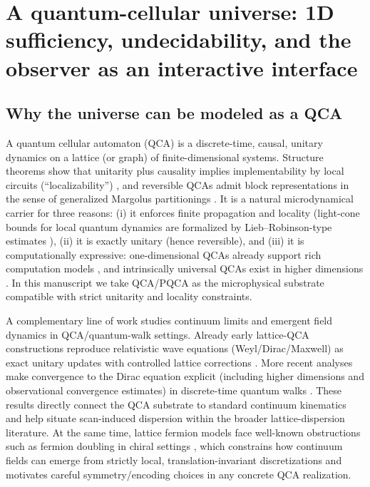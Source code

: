\section{A quantum-cellular universe: 1D sufficiency, undecidability, and the observer as an interactive interface}
\label{sec:qca}

\subsection{Why the universe can be modeled as a QCA}
A quantum cellular automaton (QCA) is a discrete-time, causal, unitary dynamics on a lattice (or graph) of finite-dimensional systems.
Structure theorems show that unitarity plus causality implies implementability by local circuits (``localizability'') \cite{ArrighiNesmeWerner2011}, and reversible QCAs admit block representations in the sense of generalized Margolus partitionings \cite{SchumacherWerner2004}.
It is a natural microdynamical carrier for three reasons:
(i) it enforces finite propagation and locality (light-cone bounds for local quantum dynamics are formalized by Lieb--Robinson-type estimates \cite{LiebRobinson1972}),
(ii) it is exactly unitary (hence reversible), and
(iii) it is computationally expressive: one-dimensional QCAs already support rich computation models \cite{Watrous1995}, and intrinsically universal QCAs exist in higher dimensions \cite{ArrighiGrattage2010}.
In this manuscript we take QCA/PQCA as the microphysical substrate compatible with strict unitarity and locality constraints.

\noindent A complementary line of work studies continuum limits and emergent field dynamics in QCA/quantum-walk settings.
Already early lattice-QCA constructions reproduce relativistic wave equations (Weyl/Dirac/Maxwell) as exact unitary updates with controlled lattice corrections \cite{BialynickiBirula1994}.
More recent analyses make convergence to the Dirac equation explicit (including higher dimensions and observational convergence estimates) in discrete-time quantum walks \cite{ArrighiNesmeForets2014,ArrighiDiMolfetta2018}.
These results directly connect the QCA substrate to standard continuum kinematics and help situate scan-induced dispersion within the broader lattice-dispersion literature.
\noindent At the same time, lattice fermion models face well-known obstructions such as fermion doubling in chiral settings \cite{NielsenNinomiya1981}, which constrains how continuum fields can emerge from strictly local, translation-invariant discretizations and motivates careful symmetry/encoding choices in any concrete QCA realization.

